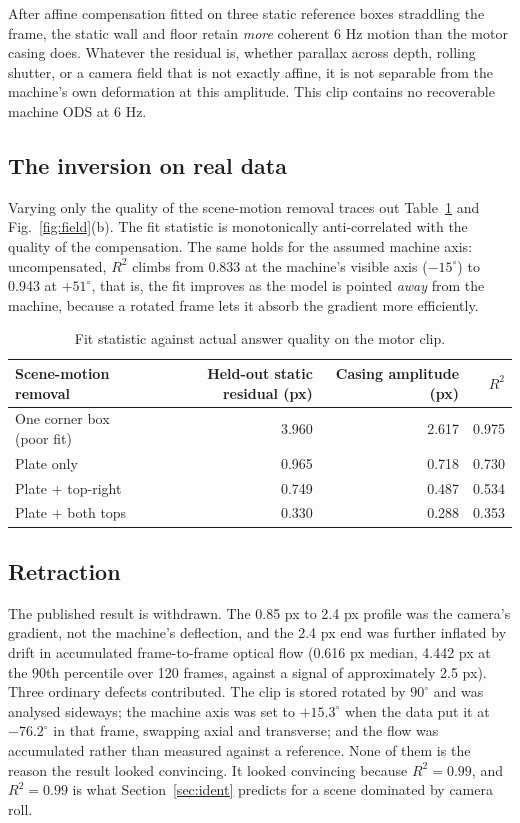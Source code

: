 \documentclass[preprint,12pt]{elsarticle}
\begin{document}
After affine compensation fitted on three static reference boxes straddling
the frame, the static wall and floor retain \emph{more} coherent 6 Hz motion
than the motor casing does. Whatever the residual is, whether parallax
across depth, rolling shutter, or a camera field that is not exactly affine,
it is not separable from the machine's own deformation at this amplitude.
This clip contains no recoverable machine ODS at 6 Hz.

\subsection{The inversion on real data}

Varying only the quality of the scene-motion removal traces out
Table~\ref{tab:inversion} and Fig.~\ref{fig:field}(b). The fit statistic is
monotonically anti-correlated with the quality of the compensation. The same
holds for the assumed machine axis: uncompensated, $R^2$ climbs from 0.833
at the machine's visible axis ($-15^\circ$) to 0.943 at $+51^\circ$, that
is, the fit improves as the model is pointed \emph{away} from the machine,
because a rotated frame lets it absorb the gradient more efficiently.

\begin{table}[htbp]
\centering
\caption{Fit statistic against actual answer quality on the motor clip.}
\label{tab:inversion}
\begin{tabular}{lrrr}
\toprule
Scene-motion removal & Held-out static residual (px)
                     & Casing amplitude (px) & $R^2$\\
\midrule
One corner box (poor fit) & 3.960 & 2.617 & 0.975\\
Plate only                & 0.965 & 0.718 & 0.730\\
Plate $+$ top-right       & 0.749 & 0.487 & 0.534\\
Plate $+$ both tops       & 0.330 & 0.288 & 0.353\\
\bottomrule
\end{tabular}
\end{table}

\subsection{Retraction}

The published result is withdrawn. The 0.85 px to 2.4 px profile was the
camera's gradient, not the machine's deflection, and the 2.4 px end was
further inflated by drift in accumulated frame-to-frame optical flow
(0.616 px median, 4.442 px at the 90th percentile over 120 frames, against a
signal of approximately 2.5 px). Three ordinary defects contributed. The
clip is stored rotated by $90^\circ$ and was analysed sideways; the machine
axis was set to $+15.3^\circ$ when the data put it at $-76.2^\circ$ in that
frame, swapping axial and transverse; and the flow was accumulated rather
than measured against a reference. None of them is the reason the result
looked convincing. It looked convincing because $R^2 = 0.99$, and
$R^2 = 0.99$ is what Section~\ref{sec:ident} predicts for a scene dominated
by camera roll.
\end{document}
